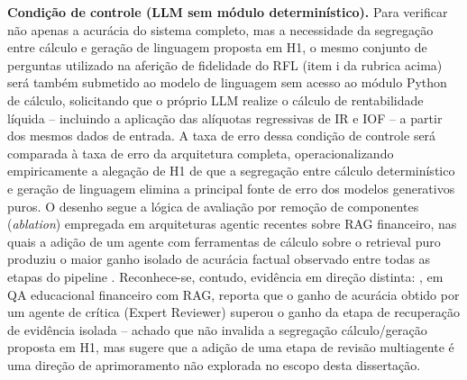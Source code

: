 \textbf{Condi\c{c}\~ao de controle (LLM sem m\'odulo determin\'istico).}
Para verificar n\~ao apenas a acur\'acia do sistema completo, mas a
necessidade da segrega\c{c}\~ao entre c\'alculo e gera\c{c}\~ao de
linguagem proposta em H1, o mesmo conjunto de perguntas utilizado na
aferi\c{c}\~ao de fidelidade do RFL (item i da rubrica acima) ser\'a tamb\'em
submetido ao modelo de linguagem sem acesso ao m\'odulo Python de
c\'alculo, solicitando que o pr\'oprio LLM realize o c\'alculo de
rentabilidade l\'iquida -- incluindo a aplica\c{c}\~ao das al\'iquotas
regressivas de IR e IOF -- a partir dos mesmos dados de entrada. A taxa
de erro dessa condi\c{c}\~ao de controle ser\'a comparada \`a taxa de
erro da arquitetura completa, operacionalizando empiricamente a
alega\c{c}\~ao de H1 de que a segrega\c{c}\~ao entre c\'alculo
determin\'istico e gera\c{c}\~ao de linguagem elimina a principal fonte
de erro dos modelos generativos puros. O desenho segue a l\'ogica de
avalia\c{c}\~ao por remo\c{c}\~ao de componentes (\textit{ablation})
empregada em arquiteturas agentic recentes sobre RAG financeiro, nas
quais a adi\c{c}\~ao de um agente com ferramentas de c\'alculo sobre o
retrieval puro produziu o maior ganho isolado de acur\'acia factual
observado entre todas as etapas do pipeline \autocite{akinfaderin2025}.
Reconhece-se, contudo, evid\^encia em dire\c{c}\~ao distinta:
\textcite{zhu2025}, em QA educacional financeiro com RAG, reporta que o
ganho de acur\'acia obtido por um agente de cr\'itica (Expert Reviewer)
superou o ganho da etapa de recupera\c{c}\~ao de evid\^encia isolada --
achado que n\~ao invalida a segrega\c{c}\~ao c\'alculo/gera\c{c}\~ao
proposta em H1, mas sugere que a adi\c{c}\~ao de uma etapa de revis\~ao
multiagente \'e uma dire\c{c}\~ao de aprimoramento n\~ao explorada no
escopo desta disserta\c{c}\~ao.


